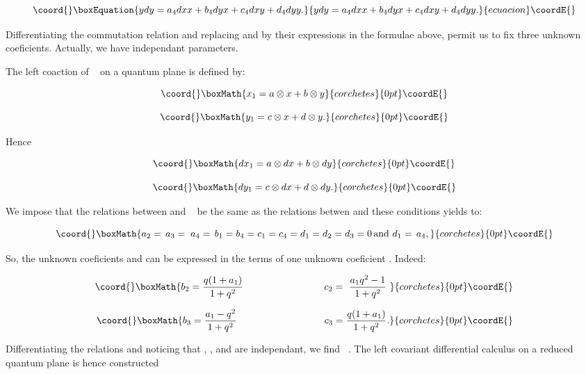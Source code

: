 \documentclass[a4paper,12pt,thmsa]{article}
\begin{document}
\begin{equation}\coord{}\boxEquation{
ydy=a_4dxx+b_4dyx+c_4dxy+d_4dyy .
}{
ydy=a_4dxx+b_4dyx+c_4dxy+d_4dyy .
}{ecuacion}\coordE{}\end{equation}

Differentiating the commutation relation\coordHE{} and replacing \coordHE{} and \coordHE{} by their expressions in the formulae above, permit us to fix three
unknown coeficients. Actually, we have \coordHE{} independant parameters.

The left coaction of \ \coordHE{} on a quantum plane is defined by:

\[\coord{}\boxMath{
x_{1}=a\otimes x+b\otimes y
}{corchetes}{0pt}\coordE{}\]

\[\coord{}\boxMath{
y_1=c\otimes x+d\otimes y.
}{corchetes}{0pt}\coordE{}\]

Hence

\[\coord{}\boxMath{
dx_{1}=a\otimes dx+b\otimes dy
}{corchetes}{0pt}\coordE{}\]

\[\coord{}\boxMath{
dy_{1}=c\otimes dx+d\otimes dy.
}{corchetes}{0pt}\coordE{}\]

We impose that the relations between \coordHE{}  \coordHE{} and \ \coordHE{}  \coordHE{} be
the same as the relations betwen \coordHE{}  \coordHE{} and \coordHE{}  \coordHE{} these conditions
yields to:

\[\coord{}\boxMath{
a_{2}=\, a_{3}=\; a_{4}=\, %
b_{1}=b_{4}=c_{1}=c_{4}=d_{1}=d_{2}=d_{3}=0\, \hbox{and }d_{1}=\,
a_{4},
}{corchetes}{0pt}\coordE{}\]

So, the unknown coeficients \coordHE{}  \coordHE{}  \coordHE{} and \coordHE{} can be expressed
in the terms of one unknown coeficient \coordHE{}. Indeed:

\[\coord{}\boxMath{
b_{2}=\frac{q(1+a_{1})}{1+q^{2}}\ \ \ \ \ \ \ \ \ \ \ \ \ \ \ \ \ \ \ \ \ \
\ \ \ c_{2}=\ \frac{a_{1}q^{2}-1}{1+q^{2}}\
}{corchetes}{0pt}\coordE{}\]

\[\coord{}\boxMath{
b_{3}=\frac{a_{1}-q^{2}}{1+q^{2}}\ \ \ \ \ \ \ \ \ \ \ \ \ \ \ \ \ \ \ \ \ \
\ \ \ \ \ c_{3}=\frac{q(1+a_{1})}{1+q^{2}}.
}{corchetes}{0pt}\coordE{}\]

Differentiating the relations \coordHE{} and noticing that \coordHE{}, \coordHE{}, \myHighlight{$%
dydy$}\coordHE{} and \coordHE{} are independant, we find \ \coordHE{}. The left covariant
differential calculus on a reduced quantum plane is hence constructed \myHighlight{$%
eqs(9-22).$}\coordHE{}
\end{document}

